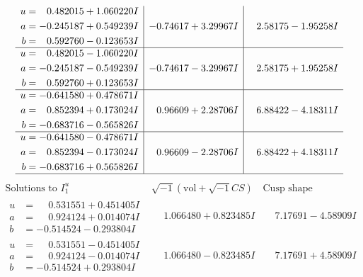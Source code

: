 \documentclass[1p]{elsarticle_modified}
\theoremstyle{definition}
\newcommand{\I}{\sqrt{-1}}
\begin{document}
$$\begin{array}{c|c|c}
\begin{aligned}
u &= \phantom{-}0.482015 + 1.060220 I \\
a &= -0.245187 + 0.549239 I \\
b &= \phantom{-}0.592760 - 0.123653 I\end{aligned}
 & -0.74617 + 3.29967 I & \phantom{-}2.58175 - 1.95258 I \\ \hline\begin{aligned}
u &= \phantom{-}0.482015 - 1.060220 I \\
a &= -0.245187 - 0.549239 I \\
b &= \phantom{-}0.592760 + 0.123653 I\end{aligned}
 & -0.74617 - 3.29967 I & \phantom{-}2.58175 + 1.95258 I \\ \hline\begin{aligned}
u &= -0.641580 + 0.478671 I \\
a &= \phantom{-}0.852394 + 0.173024 I \\
b &= -0.683716 - 0.565826 I\end{aligned}
 & \phantom{-}0.96609 + 2.28706 I & \phantom{-}6.88422 - 4.18311 I \\ \hline\begin{aligned}
u &= -0.641580 - 0.478671 I \\
a &= \phantom{-}0.852394 - 0.173024 I \\
b &= -0.683716 + 0.565826 I\end{aligned}
 & \phantom{-}0.96609 - 2.28706 I & \phantom{-}6.88422 + 4.18311 I\\
 \hline 
 \end{array}$$\newpage$$\begin{array}{c|c|c}  
\text{Solutions to }I^u_{1}& \I (\text{vol} + \sqrt{-1}CS) & \text{Cusp shape}\\
 \hline 
\begin{aligned}
u &= \phantom{-}0.531551 + 0.451405 I \\
a &= \phantom{-}0.924124 + 0.014074 I \\
b &= -0.514524 - 0.293804 I\end{aligned}
 & \phantom{-}1.066480 + 0.823485 I & \phantom{-}7.17691 - 4.58909 I \\ \hline\begin{aligned}
u &= \phantom{-}0.531551 - 0.451405 I \\
a &= \phantom{-}0.924124 - 0.014074 I \\
b &= -0.514524 + 0.293804 I\end{aligned}
 & \phantom{-}1.066480 - 0.823485 I & \phantom{-}7.17691 + 4.58909 I \\ \hline\begin{aligned}

\end{aligned}
\end{array}$$
\end{document}
